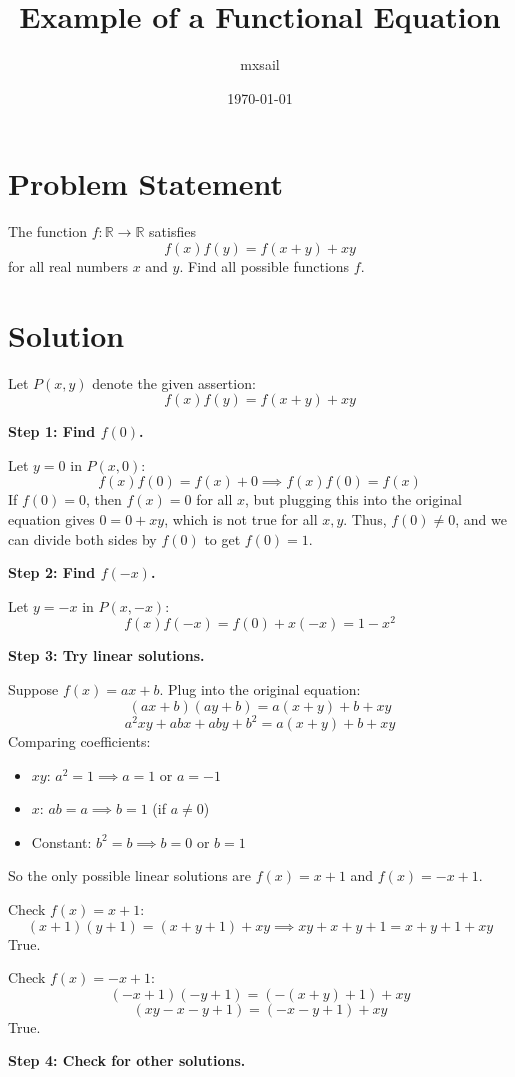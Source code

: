 \documentclass{article}
\title{Example of a Functional Equation}
\author{mxsail}
\date{\today}
\begin{document}
\maketitle

\section*{Problem Statement}
The function $f : \mathbb{R} \to \mathbb{R}$ satisfies
\[f(x) f(y) = f(x + y) + xy\]for all real numbers $x$ and $y.$ Find all possible functions $f.$

\section*{Solution}

Let $P(x, y)$ denote the given assertion:
\[
f(x)f(y) = f(x+y) + xy
\]

\textbf{Step 1: Find $f(0)$.}

Let $y = 0$ in $P(x, 0)$:
\[
f(x)f(0) = f(x) + 0 \implies f(x)f(0) = f(x)
\]
If $f(0) = 0$, then $f(x) = 0$ for all $x$, but plugging this into the original equation gives $0 = 0 + xy$, which is not true for all $x, y$. Thus, $f(0) \neq 0$, and we can divide both sides by $f(0)$ to get $f(0) = 1$.

\textbf{Step 2: Find $f(-x)$.}

Let $y = -x$ in $P(x, -x)$:
\[
f(x)f(-x) = f(0) + x(-x) = 1 - x^2
\]

\textbf{Step 3: Try linear solutions.}

Suppose $f(x) = ax + b$. Plug into the original equation:
\[
(ax + b)(ay + b) = a(x+y) + b + xy
\]
\[
a^2xy + abx + aby + b^2 = a(x+y) + b + xy
\]
Comparing coefficients:
\begin{itemize}
    \item $xy$: $a^2 = 1 \implies a = 1$ or $a = -1$
    \item $x$: $ab = a \implies b = 1$ (if $a \neq 0$)
    \item Constant: $b^2 = b \implies b = 0$ or $b = 1$
\end{itemize}
So the only possible linear solutions are $f(x) = x + 1$ and $f(x) = -x + 1$.

Check $f(x) = x + 1$:
\[
(x+1)(y+1) = (x+y+1) + xy \implies xy + x + y + 1 = x + y + 1 + xy
\]
True.

Check $f(x) = -x + 1$:
\[
(-x+1)(-y+1) = (-(x+y)+1) + xy
\]
\[
(xy - x - y + 1) = (-x - y + 1) + xy
\]
True.

\textbf{Step 4: Check for other solutions.}
\end{document}
